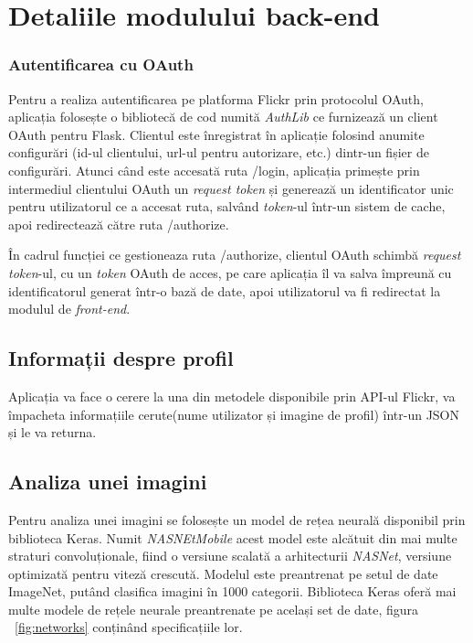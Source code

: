\section{Detaliile modulului back-end}
\subsubsection{Autentificarea cu OAuth}
Pentru a realiza autentificarea pe platforma Flickr prin protocolul OAuth, aplicația folosește o bibliotecă de cod numită \textit{AuthLib} ce furnizează un client OAuth pentru Flask. Clientul este înregistrat în aplicație folosind anumite configurări (id-ul clientului, url-ul pentru autorizare, etc.) dintr-un fișier de configurări. Atunci când este accesată ruta /login, aplicația primește prin intermediul clientului OAuth un \textit{request token} și generează un identificator unic pentru utilizatorul ce a accesat ruta, salvând \textit{token}-ul într-un sistem de cache, apoi redirectează către ruta /authorize.

În cadrul funcției ce gestioneaza ruta /authorize, clientul OAuth schimbă \textit{request token}-ul, cu un \textit{token} OAuth de acces, pe care aplicația îl va salva împreună cu identificatorul generat într-o bază de date, apoi utilizatorul va fi redirectat la modulul de \textit{front-end}.

\subsection{Informații despre profil}
Aplicația va face o cerere la una din metodele disponibile prin API-ul Flickr, va împacheta informațiile cerute(nume utilizator și imagine de profil) într-un JSON și le va returna.

\subsection{Analiza unei imagini}
Pentru analiza unei imagini se folosește un model de rețea neurală disponibil prin biblioteca Keras. Numit \textit{NASNEtMobile} acest model este alcătuit din mai multe straturi convoluționale, fiind o versiune scalată a arhitecturii \textit{NASNet}, versiune optimizată pentru viteză crescută. Modelul este preantrenat pe setul de date ImageNet, putând clasifica imagini în 1000 categorii.
Biblioteca Keras oferă mai multe modele de rețele neurale preantrenate pe același set de date, figura ~\ref{fig:networks} conținând specificațiile lor.

